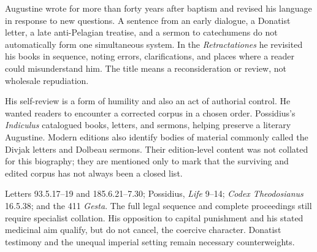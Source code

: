 Augustine wrote for more than forty years after baptism and revised his
language in response to new questions. A sentence from an early dialogue, a
Donatist letter, a late anti-Pelagian treatise, and a sermon to catechumens do
not automatically form one simultaneous system. In the \emph{Retractationes}
he revisited his books in sequence, noting errors, clarifications, and places
where a reader could misunderstand him. The title means a reconsideration or
review, not wholesale repudiation.

His self-review is a form of humility and also an act of authorial control.
He wanted readers to encounter a corrected corpus in a chosen order.
Possidius's \emph{Indiculus} catalogued books, letters, and sermons, helping
preserve a literary Augustine. Modern editions also identify bodies of material
commonly called the Divjak letters and Dolbeau sermons. Their edition-level
content was not collated for this biography; they are mentioned only to mark
that the surviving and edited corpus has not always been a closed list.

{Letters 93.5.17--19 and 185.6.21--7.30; Possidius, \emph{Life} 9--14;
\emph{Codex Theodosianus} 16.5.38; and the 411 \emph{Gesta}. The full legal
sequence and complete proceedings still require specialist collation.}
{His opposition to capital punishment and his stated medicinal aim qualify,
but do not cancel, the coercive character. Donatist testimony and the unequal
imperial setting remain necessary counterweights.}
